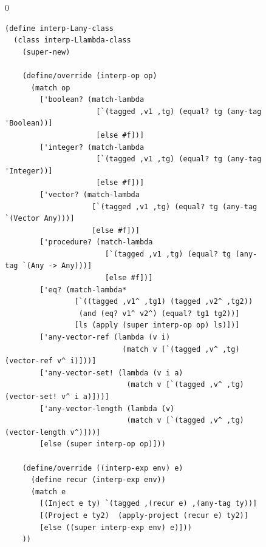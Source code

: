 \documentclass[7x10]{TimesAPriori_MIT}%
\def\racketEd{0}
\providecommand{\BookEdition}{1}
\let\edition\BookEdition
\numberwithin{theorem}{chapter}
\numberwithin{definition}{chapter}
\numberwithin{equation}{chapter}
\begin{document}
\begin{figure}[tbp]
  \begin{tcolorbox}[colback=white]
{\if\edition\racketEd
\begin{lstlisting}[basicstyle=\ttfamily\footnotesize]
(define interp-Lany-class
  (class interp-Llambda-class
    (super-new)

    (define/override (interp-op op)
      (match op
        ['boolean? (match-lambda
                     [`(tagged ,v1 ,tg) (equal? tg (any-tag 'Boolean))]
                     [else #f])]
        ['integer? (match-lambda
                     [`(tagged ,v1 ,tg) (equal? tg (any-tag 'Integer))]
                     [else #f])]
        ['vector? (match-lambda
                    [`(tagged ,v1 ,tg) (equal? tg (any-tag `(Vector Any)))]
                    [else #f])]
        ['procedure? (match-lambda
                       [`(tagged ,v1 ,tg) (equal? tg (any-tag `(Any -> Any)))]
                       [else #f])]
        ['eq? (match-lambda*
                [`((tagged ,v1^ ,tg1) (tagged ,v2^ ,tg2))
                 (and (eq? v1^ v2^) (equal? tg1 tg2))]
                [ls (apply (super interp-op op) ls)])]
        ['any-vector-ref (lambda (v i)
                           (match v [`(tagged ,v^ ,tg) (vector-ref v^ i)]))]
        ['any-vector-set! (lambda (v i a)
                            (match v [`(tagged ,v^ ,tg) (vector-set! v^ i a)]))]
        ['any-vector-length (lambda (v)
                            (match v [`(tagged ,v^ ,tg) (vector-length v^)]))]
        [else (super interp-op op)]))

    (define/override ((interp-exp env) e)
      (define recur (interp-exp env))
      (match e
        [(Inject e ty) `(tagged ,(recur e) ,(any-tag ty))]
        [(Project e ty2)  (apply-project (recur e) ty2)]
        [else ((super interp-exp env) e)]))
    ))


\end{lstlisting}}
\end{tcolorbox}
\end{figure}
\end{document}
